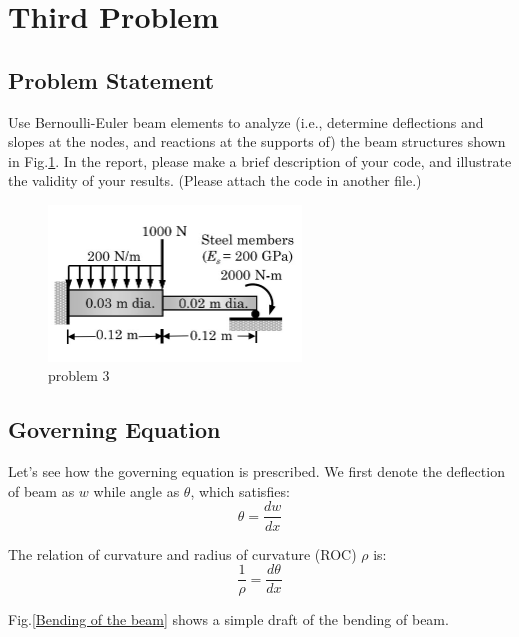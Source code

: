 \section{Third Problem}

\subsection{Problem Statement}


Use Bernoulli-Euler beam elements to analyze (i.e., determine 
deflections and slopes at the nodes, and reactions at the supports of) the beam 
structures shown in Fig.\ref{problem 3}. In the report, please make a brief description of your code, 
and illustrate the validity of your results. (Please attach the code in another file.)

\begin{figure}[H]
    \centering
    \includegraphics[width=0.6\textwidth]{image/fig2.png}
    \caption{problem 3}
    \label{problem 3}
\end{figure}

\subsection{Governing Equation}

Let's see how the governing equation is prescribed. 
We first denote the deflection of beam as $w$ while angle as $\theta$, 
which satisfies:
\begin{equation}
    \theta=\frac{dw}{dx}
\end{equation}

The relation of curvature and radius of curvature (ROC) $\rho$ is:
\begin{equation}
    \frac{1}{\rho} = \frac{d\theta}{dx}
\end{equation}

Fig.\ref{Bending of the beam} shows a simple draft of the bending of beam.

